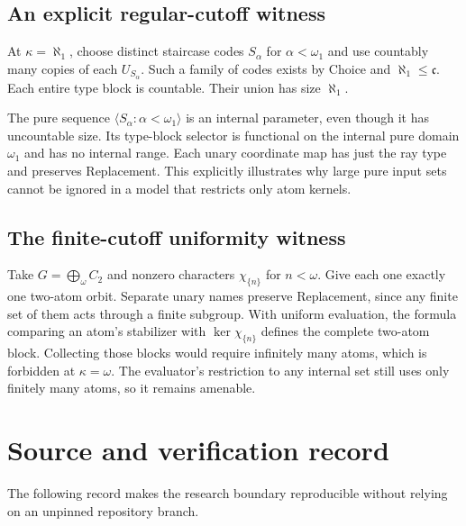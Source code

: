\documentclass[11pt,letterpaper]{article}
\numberwithin{equation}{section}
\theoremstyle{plain}
\theoremstyle{definition}
\theoremstyle{remark}
\newcommand{\cont}{\mathfrak c}
\begin{document}
\subsection{An explicit regular-cutoff witness}

At $\kappa=\aleph_1$, choose distinct staircase codes $S_\alpha$ for $\alpha<\omega_1$ and use countably many copies of each $U_{S_\alpha}$. Such a family of codes exists by Choice and $\aleph_1\leq\cont$. Each entire type block is countable. Their union has size $\aleph_1$.

The pure sequence $\langle S_\alpha:\alpha<\omega_1\rangle$ is an internal parameter, even though it has uncountable size. Its type-block selector is functional on the internal pure domain $\omega_1$ and has no internal range. Each unary coordinate map has just the ray type and preserves Replacement. This explicitly illustrates why large pure input sets cannot be ignored in a model that restricts only atom kernels.

\subsection{The finite-cutoff uniformity witness}

Take $G=\bigoplus_\omega C_2$ and nonzero characters $\chi_{\{n\}}$ for $n<\omega$. Give each one exactly one two-atom orbit. Separate unary names preserve Replacement, since any finite set of them acts through a finite subgroup. With uniform evaluation, the formula comparing an atom's stabilizer with $\ker\chi_{\{n\}}$ defines the complete two-atom block. Collecting those blocks would require infinitely many atoms, which is forbidden at $\kappa=\omega$. The evaluator's restriction to any internal set still uses only finitely many atoms, so it remains amenable.

\section{Source and verification record}\label{nee:ca:app:sources}

The following record makes the research boundary reproducible without relying on an unpinned repository branch.
\end{document}

